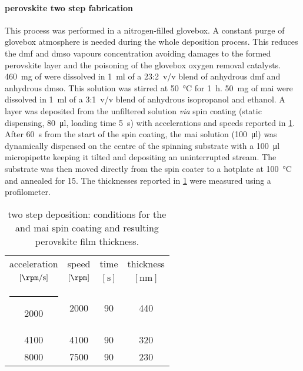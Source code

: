 		\FloatBarrier
		\paragraph{ perovskite two step fabrication}
		This process was performed in a nitrogen-filled glovebox.
		A constant purge of glovebox atmosphere is needed during the whole deposition process.
		This reduces the \gls{dmf} and \gls{dmso} vapours concentration avoiding damages to the formed perovskite layer and the poisoning of the glovebox oxygen removal catalysts.
		\SI{460}{\mg} of  were dissolved in \SI{1}{\ml} of a 23:2~v/v blend of anhydrous \gls{dmf} and anhydrous \gls{dmso}.
		This solution was stirred at \SI{50}{\celsius} for \SI{1}{\hour}.
		\SI{50}{\mg} of \gls{mai} were dissolved in \SI{1}{\ml} of a 3:1~v/v blend of anhydrous isopropanol and ethanol.
		A  layer was deposited from the unfiltered solution \textsl{via} spin coating (static dispensing, \SI{80}{\ul}, loading time \SI{5}{\s}) with accelerations and speeds reported in \cref{table:mapi_thickness}.
		After \SI{60}{\s} from the start of the spin coating, the \gls{mai} solution (\SI{100}{\ul}) was dynamically dispensed on the centre of the spinning substrate with a \SI{100}{\ul} micropipette keeping it tilted and depositing an uninterrupted stream.
		The substrate was then moved directly from the spin coater to a hotplate at \SI{100}{\celsius} and annealed for \SI{15}{\min}.
		The thicknesses reported in \cref{table:mapi_thickness} were measured using a profilometer.

		\begin{table}%
			\caption{ two step deposition: conditions for the  and \gls{mai} spin coating and resulting perovskite film thickness.}\label{table:mapi_thickness}
			\begin{center}
				\begin{tabular}{c c c | c}
					acceleration        & speed         & time        & thickness    \\
					$[\si{\rpm\per\s}]$ & $[\si{\rpm}]$ & $[\si{\s}]$ & $[\si{\nm}]$ \\[1mm]
					\hline
					\rule[0ex]{-4pt}{3ex}
					2000                & 2000          & 90          & 440          \\
					4100                & 4100          & 90          & 320          \\
					8000                & 7500          & 90          & 230          \\
				\end{tabular}
			\end{center}
		\end{table}


